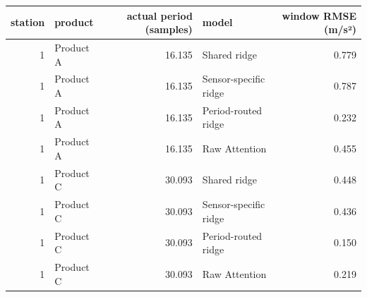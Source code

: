 \begin{tabular}{rlrlr}
\toprule
station & product & actual period (samples) & model & window RMSE (m/s²) \\
\midrule
1 & Product A & 16.135 & Shared ridge & 0.779 \\
1 & Product A & 16.135 & Sensor-specific ridge & 0.787 \\
1 & Product A & 16.135 & Period-routed ridge & 0.232 \\
1 & Product A & 16.135 & Raw Attention & 0.455 \\
1 & Product C & 30.093 & Shared ridge & 0.448 \\
1 & Product C & 30.093 & Sensor-specific ridge & 0.436 \\
1 & Product C & 30.093 & Period-routed ridge & 0.150 \\
1 & Product C & 30.093 & Raw Attention & 0.219 \\
\bottomrule
\end{tabular}
